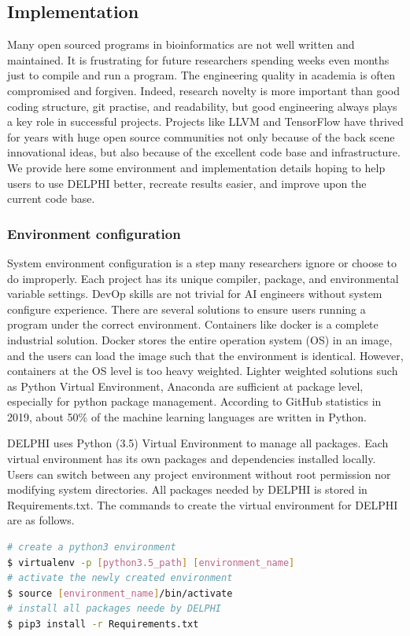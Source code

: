 \subsection{Implementation}
Many open sourced programs in bioinformatics are not well written and maintained. It is frustrating for future researchers spending weeks even months just to compile and run a program. The engineering quality in academia is often compromised and forgiven. Indeed, research novelty is more important than good coding structure, git practise, and readability, but good engineering always plays a key role in successful projects. Projects like LLVM \cite{lattner2004llvm} and TensorFlow \cite{tensorflow2015-whitepaper} have thrived for years with huge open source communities not only because of the back scene innovational ideas, but also because of the excellent code base and infrastructure. We provide here some environment and implementation details hoping to help users to use DELPHI better, recreate results easier, and improve upon the current code base.

\subsubsection{Environment configuration}
System environment configuration is a step many researchers ignore or choose to do improperly. Each project has its unique compiler, package, and environmental variable settings. DevOp skills are not trivial for AI engineers without system configure experience. There are several solutions to ensure users running a program under the correct environment. Containers like docker is a complete industrial solution. Docker stores the entire operation system (OS) in an image, and the users can load the image such that the environment is identical. However, containers at the OS level is too heavy weighted. Lighter weighted solutions such as Python Virtual Environment, Anaconda are sufficient at package level, especially for python package management. According to GitHub statistics in 2019, about 50\% of the machine learning languages are written in Python.

DELPHI uses Python (3.5) Virtual Environment to manage all packages. Each virtual environment has its own packages and dependencies installed locally. Users can switch between any project environment without root permission nor modifying system directories. All packages needed by DELPHI is stored in Requirements.txt. The commands to create the virtual environment for DELPHI are as follows.
\begin{lstlisting}[language=bash,frame=single]
# create a python3 environment
$ virtualenv -p [python3.5_path] [environment_name] 
# activate the newly created environment
$ source [environment_name]/bin/activate 
# install all packages neede by DELPHI
$ pip3 install -r Requirements.txt 
\end{lstlisting}

